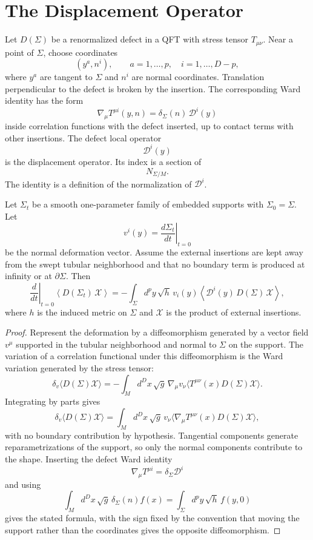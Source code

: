 \section{The Displacement Operator}

Let \(D(\Sigma)\) be a renormalized defect in a QFT with stress tensor
\(T_{\mu\nu}\).  Near a point of \(\Sigma\), choose coordinates
\[
  (y^a,n^i),\qquad
  a=1,\ldots,p,\quad i=1,\ldots,D-p,
\]
where \(y^a\) are tangent to \(\Sigma\) and \(n^i\) are normal coordinates.
Translation perpendicular to the defect is broken by the insertion.  The
corresponding Ward identity has the form
\[
  \nabla_\mu T^{\mu i}(y,n)
  =
  \delta_\Sigma(n)\,\mathcal D^i(y)
\]
inside correlation functions with the defect inserted, up to contact terms
with other insertions.  The defect local operator
\[
  \mathcal D^i(y)
\]
is the displacement operator.  Its index is a section of
\[
  N_{\Sigma/M}.
\]
The identity is a definition of the normalization of \(\mathcal D^i\).

\begin{proposition}
\label{prop:shape-variation-displacement}
Let \(\Sigma_t\) be a smooth one-parameter family of embedded supports with
\(\Sigma_0=\Sigma\).  Let
\[
  v^i(y)=\left.\frac{d\Sigma_t}{dt}\right|_{t=0}
\]
be the normal deformation vector.  Assume the external insertions are kept
away from the swept tubular neighborhood and that no boundary term is produced
at infinity or at \(\partial\Sigma\).  Then
\[
  \left.\frac{d}{dt}\right|_{t=0}
  \left\langle D(\Sigma_t)\,\mathcal X\right\rangle
  =
  -\int_\Sigma d^py\,\sqrt{h}\,
  v_i(y)
  \left\langle
    \mathcal D^i(y)\,D(\Sigma)\,\mathcal X
  \right\rangle ,
\]
where \(h\) is the induced metric on \(\Sigma\) and \(\mathcal X\) is the
product of external insertions.
\end{proposition}

\begin{proof}
Represent the deformation by a diffeomorphism generated by a vector field
\(v^\mu\) supported in the tubular neighborhood and normal to \(\Sigma\) on
the support.  The variation of a correlation functional under this
diffeomorphism is the Ward variation generated by the stress tensor:
\[
  \delta_v\langle D(\Sigma)\mathcal X\rangle
  =
  -\int_M d^Dx\,\sqrt{g}\,
  \nabla_\mu v_\nu
  \langle T^{\mu\nu}(x)D(\Sigma)\mathcal X\rangle .
\]
Integrating by parts gives
\[
  \delta_v\langle D(\Sigma)\mathcal X\rangle
  =
  \int_M d^Dx\,\sqrt{g}\,
  v_\nu
  \langle\nabla_\mu T^{\mu\nu}(x)D(\Sigma)\mathcal X\rangle ,
\]
with no boundary contribution by hypothesis.  Tangential components generate
reparametrizations of the support, so only the normal components contribute
to the shape.  Inserting the defect Ward identity
\[
  \nabla_\mu T^{\mu i}=\delta_\Sigma\mathcal D^i
\]
and using
\[
  \int_M d^Dx\,\sqrt{g}\,\delta_\Sigma(n)f(x)
  =
  \int_\Sigma d^py\,\sqrt h\,f(y,0)
\]
gives the stated formula, with the sign fixed by the convention that moving
the support rather than the coordinates gives the opposite diffeomorphism.
\end{proof}

